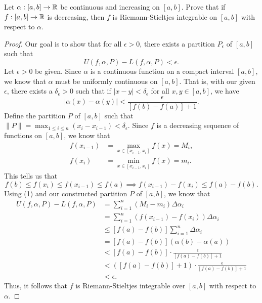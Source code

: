 \documentclass[a4paper]{article}
\begin{document}
\begin{problem}
    Let \( \alpha: [a,b] \to \mathbb{R}  \) be continuous and increasing on \( [a,b] \). Prove that if \( f: [a,b] \to \mathbb{R}  \) is decreasing, then \( f  \) is Riemann-Stieltjes integrable on \( [a,b] \) with respect to \( \alpha \). 
\end{problem}
\begin{proof}
    Our goal is to show that for all \( \epsilon > 0  \), there exists a partition \( {P}_{\epsilon}  \) of \( [a,b] \) such that 
    \[  U(f,\alpha, P) - L(f,\alpha, P ) < \epsilon. \]
    Let \( \epsilon > 0  \) be given. Since \( \alpha  \) is a continuous function on a compact interval \( [a,b] \), we know that \( \alpha  \) must be uniformly continuous on \( [a,b] \). That is, with our given \( \epsilon  \), there exists a \( \delta_{\epsilon} > 0  \) such that if \( | x - y  |  < {\delta}_{\epsilon} \) for all \( x,y \in [a,b] \), we have
    \[  | \alpha(x) - \alpha(y) |  < \frac{ \epsilon }{ [f(b) - f(a)]  + 1 }.  \]
    Define the partition \( P  \) of \( [a,b] \) such that \( \|P\| = \max_{1 \leq i \leq n} ({x}_{i} - {x}_{i-1}) < {\delta}_{\epsilon}  \). Since \( f  \) is a decreasing sequence of functions on \( [a,b] \), we know that 
    \begin{align*}
        f({x}_{i-1}) &= \max_{x \in [{x}_{i-1}, {x}_{i}]} f(x) = {M}_{i}, \\
        f({x}_{i}) &= \min_{x \in [{x}_{i-1}, {x}_{i}]} f(x) = {m}_{i}.
    \end{align*}
    This tells us that 
    \[ f(b) \leq f({x}_{i}) \leq f({x}_{i-1}) \leq f(a) \implies f({x}_{i-1}) - f({x}_{i}) \leq f(a) - f(b).  \tag{1} \]
    Using (1) and our constructed partition \( P  \) of \( [a,b] \), we know that 
    \begin{align*}
        U(f,\alpha, P) - L(f,\alpha, P ) &= \sum_{ i=1  }^{ n } ({M}_{i} - {m}_{i}) \Delta {\alpha}_{i} \\
                                         &= \sum_{ i=1  }^{ n } (f({x}_{i-1}) - f({x}_{i})) \Delta {\alpha}_{i} \\
                                         &\leq  [f(a) - f(b)] \sum_{ i=1  }^{ n }  \Delta {\alpha}_{i} \\
                                         &= [f(a) -f(b)] (\alpha(b) - \alpha(a)) \\
                                         &< [f(a) - f(b)] \cdot \frac{ \epsilon }{ [f(a) - f(b)] + 1  } \\ 
                                         &<  ([f(a) - f(b) ] + 1 )  \cdot \frac{ \epsilon }{ [f(a) - f(b)] +  1  } \\
                                         & < \epsilon.
    \end{align*}
    Thus, it follows that \( f  \) is Riemann-Stieltjes integrable over \( [a,b]  \) with respect to \( \alpha \).


\end{proof}
\end{document}
